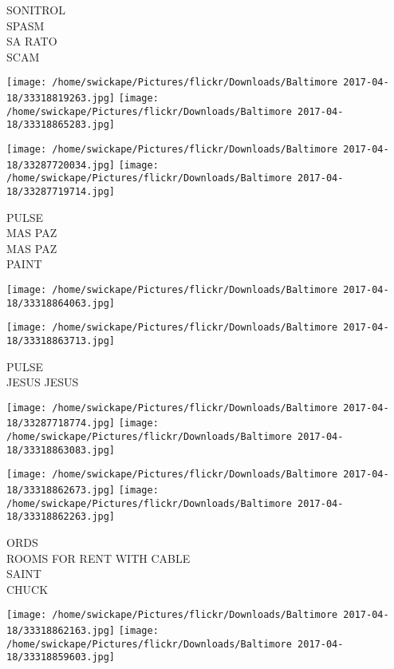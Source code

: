 \documentclass[10pt,letterpaper]{article}
\begin{document}
SONITROL\\
SPASM\\
SA RATO\\
SCAM\\
\pagebreak

\texttt{[image: /home/swickape/Pictures/flickr/Downloads/Baltimore 2017-04-18/33318819263.jpg]}
\texttt{[image: /home/swickape/Pictures/flickr/Downloads/Baltimore 2017-04-18/33318865283.jpg]}

\texttt{[image: /home/swickape/Pictures/flickr/Downloads/Baltimore 2017-04-18/33287720034.jpg]}
\texttt{[image: /home/swickape/Pictures/flickr/Downloads/Baltimore 2017-04-18/33287719714.jpg]}

PULSE\\
MAS PAZ\\
MAS PAZ\\
PAINT\\
\pagebreak

\texttt{[image: /home/swickape/Pictures/flickr/Downloads/Baltimore 2017-04-18/33318864063.jpg]}

\vspace{0.25in}
\texttt{[image: /home/swickape/Pictures/flickr/Downloads/Baltimore 2017-04-18/33318863713.jpg]}

PULSE\\
JESUS JESUS\\
\pagebreak

\texttt{[image: /home/swickape/Pictures/flickr/Downloads/Baltimore 2017-04-18/33287718774.jpg]}
\texttt{[image: /home/swickape/Pictures/flickr/Downloads/Baltimore 2017-04-18/33318863083.jpg]}

\texttt{[image: /home/swickape/Pictures/flickr/Downloads/Baltimore 2017-04-18/33318862673.jpg]}
\texttt{[image: /home/swickape/Pictures/flickr/Downloads/Baltimore 2017-04-18/33318862263.jpg]}

ORDS\\
ROOMS FOR RENT WITH CABLE\\
SAINT\\
CHUCK\\
\pagebreak

\texttt{[image: /home/swickape/Pictures/flickr/Downloads/Baltimore 2017-04-18/33318862163.jpg]}
\texttt{[image: /home/swickape/Pictures/flickr/Downloads/Baltimore 2017-04-18/33318859603.jpg]}
\end{document}
